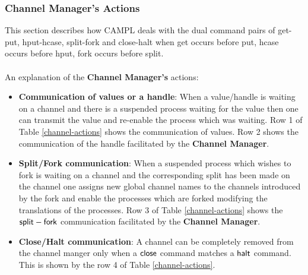 \documentclass[11pt]{article}
\newcommand{\<}{\langle}
\renewcommand{\>}{\rangle}
\begin{document}
\subsubsection{Channel Manager's Actions}{\label{channel-manager}} \label{ChanManAct}
This section describes how CAMPL deals with the dual command pairs of {\sf get-put}, {\sf hput-hcase}, {\sf split-fork} and {\sf close-halt} when {\sf get} occurs before {\sf put}, 
{\sf hcase} occurs before {\sf hput}, {\sf fork} occurs before {\sf split}.
~~\\~~\\
An explanation of the {\bf Channel Manager's} actions:
\begin{itemize}
  \item {\bf Communication of values or a handle}:
When a value/handle is waiting on a channel and there is a suspended process waiting for the value then one can transmit the value and re-enable the process which was waiting. Row 1 of Table \ref {channel-actions} shows the communication of {\sf values}. Row 2 shows the communication of the {\sf handle} facilitated by the {\bf Channel Manager}.

\item {\bf Split/Fork communication}:
When a suspended process which wishes to fork is waiting on a channel and the corresponding split has been made on the channel one assigns new global channel names to the channels introduced by the fork and enable the processes which are forked modifying the translations of the processes. Row 3 of Table \ref {channel-actions} shows the ${\sf split-fork}$ communication facilitated by the {\bf Channel Manager}.

\item {\bf Close/Halt communication}:
A channel can be completely removed from the channel manger only when a ${\sf close}$ command matches a ${\sf halt}$ command. This is shown by the row 4 of Table \ref {channel-actions}.

\end{itemize}
\end{document}
